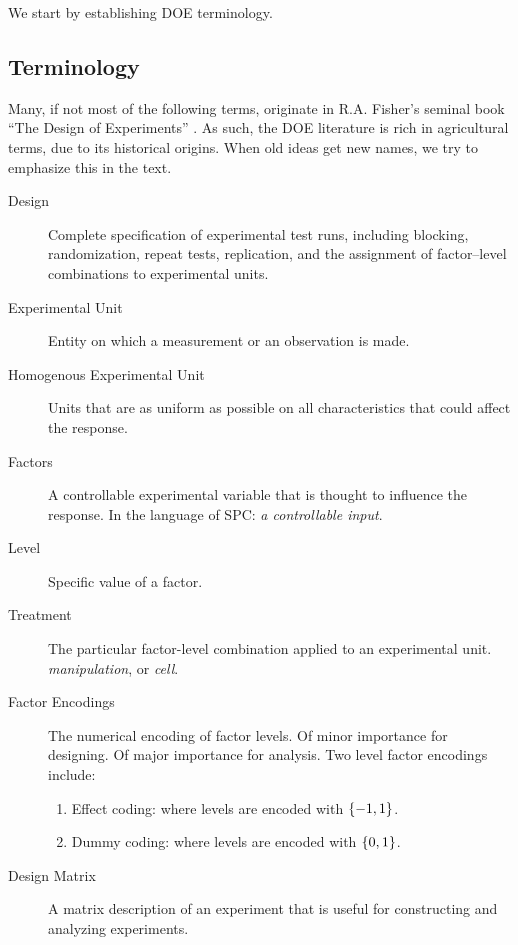 We start by establishing DOE terminology. 


\subsection{Terminology}
Many, if not most of the following terms, originate in R.A. Fisher's seminal book ``The Design of Experiments'' \citep{fisher_design_1960}. 
As such, the DOE literature is rich in agricultural terms, due to its historical origins.
When old ideas get new names, we try to emphasize this in the text.


\begin{tcolorbox}[breakable]
\begin{description}

\item [Design]  Complete specification of experimental test runs, including blocking, randomization, repeat tests, replication, and the assignment of factor–level combinations to experimental units.

\item [Experimental Unit]  Entity on which a measurement or an observation is made.

\item [Homogenous Experimental Unit] Units that are as uniform as possible on all characteristics that could affect the response.

\item [Factors]  A controllable experimental variable that is thought to influence the response. 
In the language of SPC: \emph{a controllable input}.

\item [Level] Specific value of a factor.

\item[Treatment] The particular factor-level combination applied to an experimental unit. 
\Aka \emph{manipulation}, or \emph{cell}.

\item [Factor Encodings] 
The numerical encoding of factor levels.
Of minor importance for designing. 
Of major importance for analysis.
Two level factor encodings include:
	\begin{enumerate}
	\item Effect coding: where levels are encoded with $\{ -1,1 \}$.
	\item Dummy coding: where levels are encoded with $\{ 0,1 \}$.
	\end{enumerate}

\item [Design Matrix] A matrix description of an experiment that is useful for constructing and analyzing experiments.


\end{description}
\end{tcolorbox}
